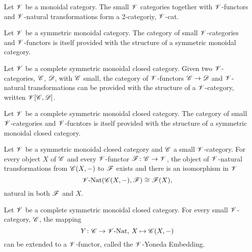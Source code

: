 \documentclass[dissertation.tex]{subfiles}
\begin{document}
\begin{prop}
  Let $\mathscr{V}$ be a monoidal category.
  The small $\mathscr{V}$ categories together with $\mathscr{V}$-functors and $\mathscr{V}$-natural transformations form a 2-categoriy, $\mathscr{V}$-cat.
\end{prop}

\begin{prop}
  Let $\mathscr{V}$ be a symmetric monoidal category.
  The category of small $\mathscr{V}$-categories and $\mathscr{V}$-functors is itself provided with the structure of a symmetric monoidal category.
\end{prop}

\begin{prop}
  Let $\mathscr{V}$ be a complete symmetric monoidal closed category.
  Given two $\mathscr{V}$-categories, $\mathscr{C}$, $\mathscr{D}$, with $\mathscr{C}$ small, the category of $\mathscr{V}$-functors $\mathscr{C} \to \mathscr{D}$ and $\mathscr{V}$-natural transformations can be provided with the structure of a $\mathscr{V}$-category, written $\mathscr{V}[\mathscr{C},\mathscr{D}]$.
\end{prop}

\begin{cor}
  Let $\mathscr{V}$ be a complete symmetric monoidal closed category.
  The category of small $\mathscr{V}$-categories and $\mathscr{V}$-fucntors is itself provided with the structure of a symmetric monoidal closed category.
\end{cor}

\begin{thm}
  Let $\mathscr{V}$ be a symmetric monoidal closed category and $\mathscr{C}$ a small $\mathscr{V}$-category.
  For every object $X$ of $\mathscr{C}$ and every $\mathscr{V}$-functor $\mathscr{F} \colon \mathscr{C} \to \mathscr{V}$, the object of $\mathscr{V}$-natural transformations from $\mathscr{C}(X,-)$ to $\mathscr{F}$ exists and there is an isomorphism in $\mathscr{V}$
  $$\operatorname{\mathscr{V}-Nat}(\mathscr{C}(X,-),\mathscr{F}) \cong \mathscr{F}(X),$$
  natural in both $\mathscr{F}$ and $X$.
\end{thm}

\begin{cor}
  Let $\mathscr{V}$ be a complete symmetric monoidal closed category.
  For every small $\mathscr{V}$-category, $\mathscr{C}$, the mapping
  $$Y \colon \mathscr{C} \to \operatorname{\mathscr{V}-Nat},\, X \mapsto \mathscr{C}(X,-)$$
  can be extended to a $\mathscr{V}$-functor, called the $\mathscr{V}$-Yoneda Embedding.
\end{cor}
\end{document}
